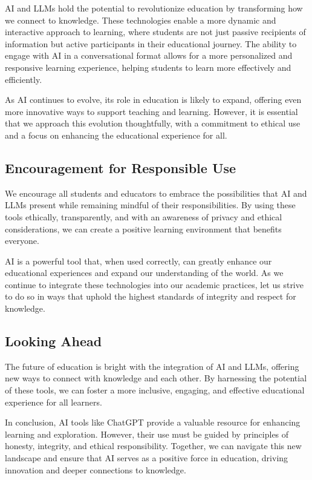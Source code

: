 \documentclass{article}
\begin{document}
AI and LLMs hold the potential to revolutionize education by transforming how we connect to knowledge. These technologies enable a more dynamic and interactive approach to learning, where students are not just passive recipients of information but active participants in their educational journey. The ability to engage with AI in a conversational format allows for a more personalized and responsive learning experience, helping students to learn more effectively and efficiently.

As AI continues to evolve, its role in education is likely to expand, offering even more innovative ways to support teaching and learning. However, it is essential that we approach this evolution thoughtfully, with a commitment to ethical use and a focus on enhancing the educational experience for all.

\subsection{Encouragement for Responsible Use}

We encourage all students and educators to embrace the possibilities that AI and LLMs present while remaining mindful of their responsibilities. By using these tools ethically, transparently, and with an awareness of privacy and ethical considerations, we can create a positive learning environment that benefits everyone.

AI is a powerful tool that, when used correctly, can greatly enhance our educational experiences and expand our understanding of the world. As we continue to integrate these technologies into our academic practices, let us strive to do so in ways that uphold the highest standards of integrity and respect for knowledge.

\subsection{Looking Ahead}

The future of education is bright with the integration of AI and LLMs, offering new ways to connect with knowledge and each other. By harnessing the potential of these tools, we can foster a more inclusive, engaging, and effective educational experience for all learners.

In conclusion, AI tools like ChatGPT provide a valuable resource for enhancing learning and exploration. However, their use must be guided by principles of honesty, integrity, and ethical responsibility. Together, we can navigate this new landscape and ensure that AI serves as a positive force in education, driving innovation and deeper connections to knowledge.
\end{document}
